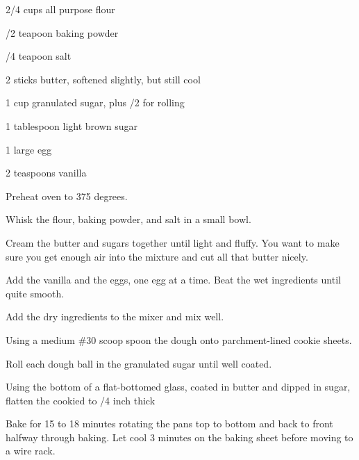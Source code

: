 %
%
%
%
\newpage



\begin{IngredientsAndSteps}
    \ListIngredientsAndSteps
    {
        2/4 cups all purpose flour

        /2 teapoon baking powder

        /4 teapoon salt

        \IngredientsSeparatorClear

        2 sticks butter, softened slightly, but still cool

        1 cup granulated sugar, plus /2 for rolling

        1 tablespoon light brown sugar

        \IngredientsSeparatorClear

        1 large egg

        2 teaspoons vanilla
    }
    {
        Preheat oven to 375 degrees.

        Whisk the flour, baking powder, and salt in a small bowl.

        Cream the butter and sugars together until light and fluffy. You want to make sure you get
        enough air into the mixture and cut all that butter nicely.

        Add the vanilla and the eggs, one egg at a time. Beat the wet ingredients until quite smooth.

        Add the dry ingredients to the mixer and mix well.

        Using a medium \#30 scoop spoon the dough onto parchment-lined cookie sheets.

        Roll each dough ball in the granulated sugar until well coated.

        Using the bottom of a flat-bottomed glass, coated in butter and dipped in sugar,
        flatten the cookied to /4 inch thick

        Bake for 15 to 18 minutes rotating the pans top to bottom and back to front halfway
        through baking. Let cool 3 minutes on the baking sheet before moving to a wire rack.
    }
\end{IngredientsAndSteps}

